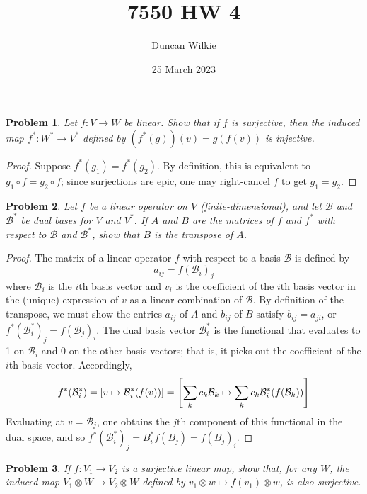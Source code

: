 \documentclass{article}
\title{7550 HW 4}
\author{Duncan Wilkie}
\date{25 March 2023}
\newtheorem{plm}{Problem}
\begin{document}
\maketitle

\begin{plm}
  Let $f: V \to W$ be linear.
  Show that if $f$ is surjective, then the induced map $f^{*}: W^{*} \to V^{*}$ defined by $(f^{*}(g))(v) = g(f(v))$ is injective.
\end{plm}

\begin{proof}
  Suppose $f^{*}(g_{1}) = f^{*}(g_{2})$.
  By definition, this is equivalent to $g_{1} \circ f = g_{2} \circ f$; since surjections are epic, one may right-cancel $f$
  to get $g_{1} = g_{2}$.
\end{proof}


\begin{plm}
  Let $f$ be a linear operator on $V$ (finite-dimensional), and let $\mathcal{B}$ and $\mathcal{B}^{*}$ be dual bases for $V$ and $V^{*}$.
  If $A$ and $B$ are the matrices of $f$ and $f^{*}$ with respect to $\mathcal{B}$ and $\mathcal{B}^{*}$,
  show that $B$ is the transpose of $A$.
\end{plm}

\begin{proof}
  The matrix of a linear operator $f$ with respect to a basis $\mathcal{B}$ is defined by
  \[
    a_{ij} = f(\mathcal{B}_{i})_{j}
  \]
  where $\mathcal{B}_{i}$ is the $i$th basis vector and $v_{i}$ is the coefficient of the $i$th basis vector in the (unique) expression of $v$
  as a linear combination of $\mathcal{B}$.
  By definition of the transpose, we must show the entries $a_{ij}$ of $A$ and $b_{ij}$ of $B$ satisfy $b_{ij} = a_{ji}$,
  or $f^{*}(\mathcal{B}^{*}_{i})_{j} = f(\mathcal{B}_{j})_{i}$.
  The dual basis vector $\mathcal{B}^{*}_{i}$ is the functional that evaluates to 1 on $\mathcal{B}_{i}$ and 0 on the other basis vectors;
  that is, it picks out the coefficient of the $i$th basis vector.
  Accordingly,
  \[
    f^{*}(\mathcal{B}^{*}_{i}) = \qty[v \mapsto \mathcal{B}^{*}_{i}(f(v))]
    = \qty[\sum_{k}c_{k}\mathcal{B}_{k} \mapsto \sum_{k}c_{k}\mathcal{B}^{*}_{i}(f(\mathcal{B}_{k}))]
  \]
  Evaluating at $v = \mathcal{B}_{j}$, one obtains the $j$th component of this functional in the dual space,
  and so $f^{*}(\mathcal{B}_{i}^{*})_{j} = B_{i}^{*}f(B_{j}) = f(B_{j})_{i}$.
\end{proof}

\begin{plm}
  If $f: V_{1} \to V_{2}$ is a surjective linear map, show that, for any $W$, the induced map $V_{1} \otimes W \to V_{2} \otimes W$
  defined by $v_{1} \otimes w \mapsto f(v_{1}) \otimes w$, is also surjective.
\end{plm}
\end{document}
